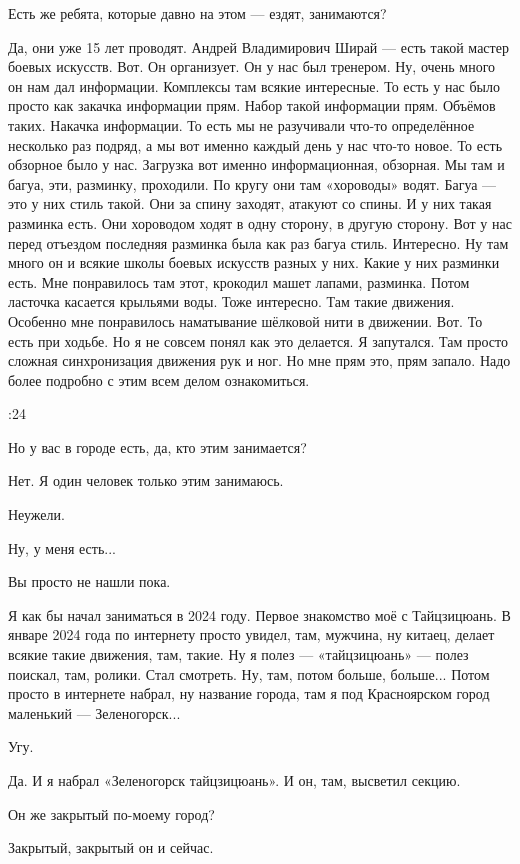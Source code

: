 \A
Есть же ребята, которые давно на этом --- ездят, занимаются?

\I
Да, они уже 15 лет проводят.
Андрей Владимирович Ширай --- есть
такой мастер боевых искусств.
Вот.
Он организует.
Он у нас был тренером.
Ну, очень много он нам дал информации.
Комплексы там всякие интересные.
То есть у нас было просто как закачка информации прям.
Набор такой информации прям.
Объёмов таких.
Накачка информации.
То есть мы не разучивали что-то определённое несколько раз подряд,
а мы вот именно каждый день у нас что-то новое.
То есть обзорное было у нас.
Загрузка вот именно информационная, обзорная.
Мы там и багуа, эти, разминку, проходили. По кругу
они там «хороводы» водят.
Багуа --- это у них стиль такой.
Они за спину заходят, атакуют со спины.
И у них такая разминка есть.
Они хороводом ходят в одну сторону, в другую сторону.
Вот у нас перед отъездом последняя разминка была как раз багуа стиль.
Интересно.
Ну там много он и всякие школы боевых искусств разных у них.
Какие у них разминки есть.
Мне понравилось там этот, крокодил машет лапами, разминка.
Потом ласточка касается крыльями воды.
Тоже интересно.
Там такие движения.
Особенно мне понравилось наматывание шёлковой нити в движении.
Вот.
То есть при ходьбе.
Но я не совсем понял как это делается.
Я запутался.
Там просто сложная синхронизация движения рук и ног.
Но мне прям это, прям запало.
Надо более подробно с этим всем делом ознакомиться.

:24

\A
Но у вас в городе есть, да, кто этим занимается?

\I
Нет.
Я один человек только этим занимаюсь.

\A
Неужели.

\I
Ну, у меня есть...

\A
Вы просто не нашли пока.

\I
Я как бы начал заниматься в 2024 году.
Первое знакомство моё с Тайцзицюань.
В январе
2024 года по интернету просто увидел, там,
мужчина, ну китаец, делает всякие такие движения, там, такие.
Ну я полез --- «тайцзицюань» --- полез поискал, там, ролики. Стал смотреть.
Ну, там, потом больше, больше... Потом просто в интернете набрал, ну название города, там я под
Красноярском город маленький --- Зеленогорск...

\A
Угу.

\I
Да. И я набрал «Зеленогорск тайцзицюань».
И он, там, высветил секцию.

\A
Он же закрытый по-моему город?

\I
Закрытый, закрытый он и сейчас.

